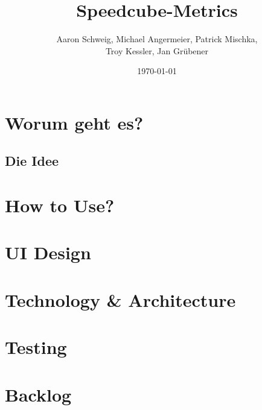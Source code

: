 \documentclass[a4paper]{article}
\title{Speedcube-Metrics}
\author{Aaron Schweig, Michael Angermeier, Patrick Mischka, \\ Troy Kessler, Jan Grübener}
\date{{\today}}
\begin{document}
	\maketitle
	\section{Worum geht es?}
	\subsection{Die Idee}
	\section{How to Use?}
	\section{UI Design}
	\section{Technology \& Architecture}
	\section{Testing}
	\section{Backlog}
\end{document}
